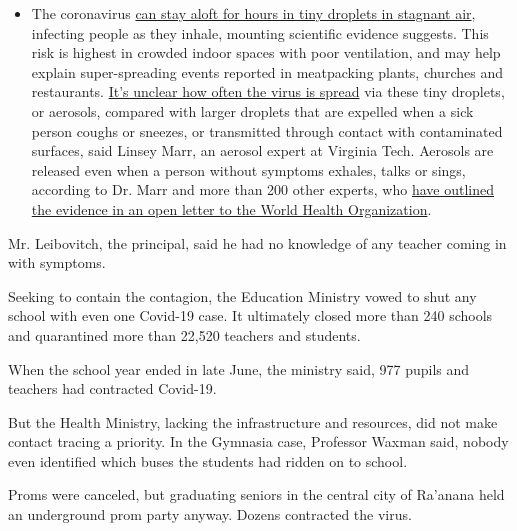 \begin{itemize}
  \begin{itemize}
  \tightlist
  \item
    The coronavirus
    \href{https://www.nytimes3xbfgragh.onion/2020/07/04/health/239-experts-with-one-big-claim-the-coronavirus-is-airborne.html?action=click\&pgtype=Article\&state=default\&region=MAIN_CONTENT_3\&context=storylines_faq}{can
    stay aloft for hours in tiny droplets in stagnant air}, infecting
    people as they inhale, mounting scientific evidence suggests. This
    risk is highest in crowded indoor spaces with poor ventilation, and
    may help explain super-spreading events reported in meatpacking
    plants, churches and restaurants.
    \href{https://www.nytimes3xbfgragh.onion/2020/07/06/health/coronavirus-airborne-aerosols.html?action=click\&pgtype=Article\&state=default\&region=MAIN_CONTENT_3\&context=storylines_faq}{It's
    unclear how often the virus is spread} via these tiny droplets, or
    aerosols, compared with larger droplets that are expelled when a
    sick person coughs or sneezes, or transmitted through contact with
    contaminated surfaces, said Linsey Marr, an aerosol expert at
    Virginia Tech. Aerosols are released even when a person without
    symptoms exhales, talks or sings, according to Dr. Marr and more
    than 200 other experts, who
    \href{https://academic.oup.com/cid/article/doi/10.1093/cid/ciaa939/5867798}{have
    outlined the evidence in an open letter to the World Health
    Organization}.
  \end{itemize}
\end{itemize}

Mr. Leibovitch, the principal, said he had no knowledge of any teacher
coming in with symptoms.

Seeking to contain the contagion, the Education Ministry vowed to shut
any school with even one Covid-19 case. It ultimately closed more than
240 schools and quarantined more than 22,520 teachers and students.

When the school year ended in late June, the ministry said, 977 pupils
and teachers had contracted Covid-19.

But the Health Ministry, lacking the infrastructure and resources, did
not make contact tracing a priority. In the Gymnasia case, Professor
Waxman said, nobody even identified which buses the students had ridden
on to school.

Proms were canceled, but graduating seniors in the central city of
Ra'anana held an underground prom party anyway. Dozens contracted the
virus.

